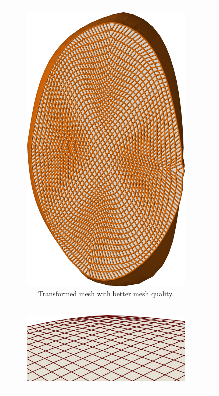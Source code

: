 \begin{figure}
\begin{tabular}{cc}
\begin{subfigure}[t]{0.30\textwidth}
      \centering%
      \includegraphics[width=\textwidth]{images/parallel_fiber_estimation/mesh47_b.png}
      \caption{Transformed mesh with better mesh quality.}%
      \label{fig:mesh47_b}%
    \end{subfigure}  
    \\
    \begin{subfigure}[t]{0.48\textwidth}%
      \centering%
      \includegraphics[width=\textwidth]{images/parallel_fiber_estimation/mesh47a_.png}

\end{subfigure}
\end{tabular}
\end{figure}
